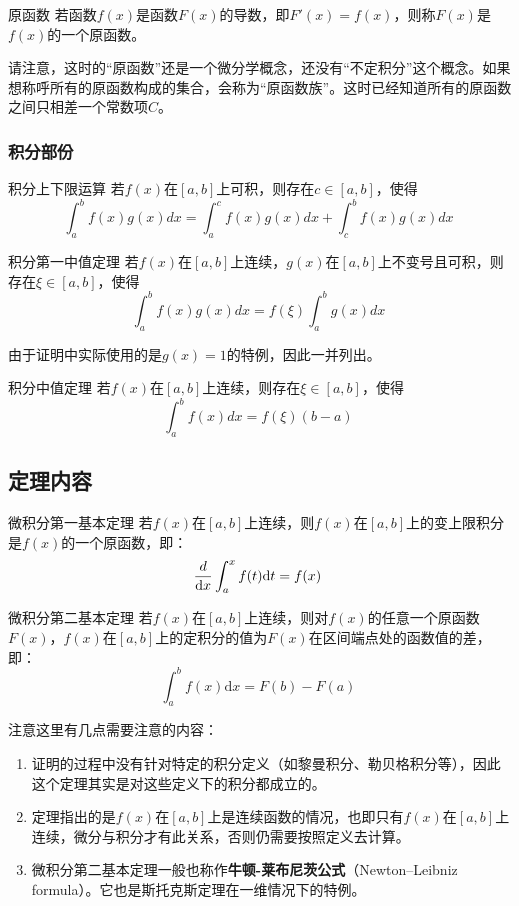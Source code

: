 \begin{definition}{原函数}\label{def_FTcalc_3}
若函数$f(x)$是函数$F(x)$的导数，即$F'(x)=f(x)$，则称$F(x)$是$f(x)$的一个原函数。
\end{definition}

请注意，这时的“原函数”还是一个微分学概念，还没有“不定积分”这个概念。如果想称呼所有的原函数构成的集合，会称为“原函数族”。这时已经知道所有的原函数之间只相差一个常数项$C$。

\subsubsection{积分部份}

\begin{lemma}{积分上下限运算}\label{lem_FTcalc_1}
若$f(x)$在$[a,b]$上可积，则存在$c\in[a,b]$，使得
$$\int_{a}^{b} f(x)g(x)dx=\int_{a}^{c} f(x)g(x)dx+\int_{c}^{b} f(x)g(x)dx~$$
\end{lemma}

\begin{lemma}{积分第一中值定理}
若$f(x)$在$[a,b]$上连续，$g(x)$在$[a,b]$上不变号且可积，则存在$\xi\in[a,b]$，使得
$$\int_{a}^{b} f(x)g(x)dx=f(\xi)\int_{a}^{b} g(x)dx~$$
\end{lemma}

由于证明中实际使用的是$g(x)=1$的特例，因此一并列出。

\begin{lemma}{积分中值定理}\label{lem_FTcalc_2}
若$f(x)$在$[a,b]$上连续，则存在$\xi\in[a,b]$，使得
$$\int_{a}^{b} f(x)dx=f(\xi)(b-a)~$$
\end{lemma}

\subsection{定理内容}

\begin{theorem}{微积分第一基本定理}
若$f(x)$在$[a,b]$上连续，则$f(x)$在$[a,b]$上的变上限积分是$f(x)$的一个原函数，即：
$${d\over\mathrm {d}x}\int_{a}^{x}f(t)\mathrm {d}t=f(x)~$$
\end{theorem}

\begin{theorem}{微积分第二基本定理}
若$f(x)$在$[a,b]$上连续，则对$f(x)$的任意一个原函数$F(x)$，$f(x)$在$[a,b]$上的定积分的值为$F(x)$在区间端点处的函数值的差，即：
$$\int_{a}^{b} f(x)\mathrm {d}x=F(b)-F(a)~$$
\end{theorem}

注意这里有几点需要注意的内容：
\begin{enumerate}
\item 证明的过程中没有针对特定的积分定义（如黎曼积分、勒贝格积分等），因此这个定理其实是对这些定义下的积分都成立的。
\item 定理指出的是$f(x)$在$[a,b]$上是连续函数的情况，也即只有$f(x)$在$[a,b]$上连续，微分与积分才有此关系，否则仍需要按照定义去计算。
\item 微积分第二基本定理一般也称作\textbf{牛顿-莱布尼茨公式}（Newton–Leibniz formula）。它也是斯托克斯定理在一维情况下的特例。
\end{enumerate}


